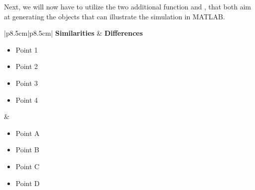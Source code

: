 Next, we will now have to utilize the two additional function \verb|| and \verb||, that both aim at generating the objects that can illustrate the simulation in MATLAB.



\begin{table}[h!]
\centering
\begin{tabular}{|p{8.5cm}|p{8.5cm}|} %
\hline
\textbf{Similarities} & \textbf{Differences} \\
\hline
\begin{minipage}{\linewidth}
\vspace{0.2cm} %
\begin{itemize}[leftmargin=*] 
    \item Point 1
    \item Point 2
    \item Point 3
    \item Point 4
\end{itemize} 
\vspace{0.05cm} %
\end{minipage}
& 
\begin{minipage}{\linewidth}
\vspace{0.2cm}
\begin{itemize}[leftmargin=*] 
    \item Point A
    \item Point B
    \item Point C
    \item Point D
\end{itemize} 
\vspace{0.05cm} %
\end{minipage} \\
\hline
\end{tabular}
\caption{Similarities and Differences Table}
\end{table}